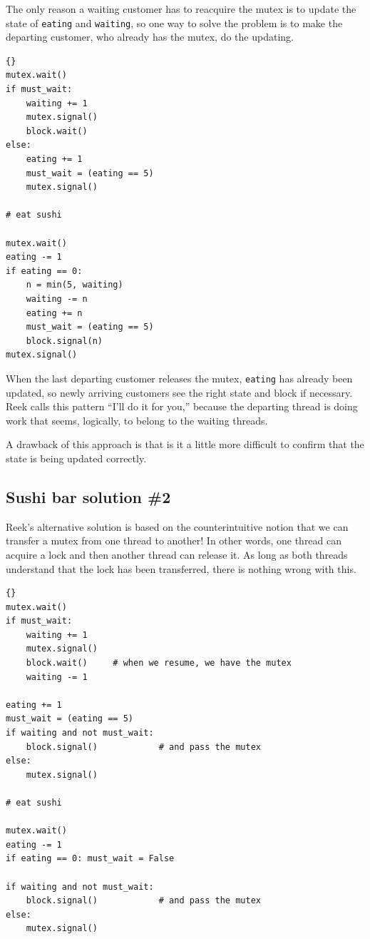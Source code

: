 \documentclass{book}
\newcommand{\clearemptydoublepage}{\newpage\cleardoublepage}
\begin{document}
The only reason a waiting customer has to reacquire the mutex
is to update the state of {\tt eating} and {\tt waiting}, so
one way to solve the problem is to make the departing customer,
who already has the mutex, do the updating.

\begin{lstlisting}[caption={Sushi bar solution \#1}]{}
mutex.wait()
if must_wait:
    waiting += 1
    mutex.signal()
    block.wait()
else:
    eating += 1
    must_wait = (eating == 5)
    mutex.signal()

# eat sushi

mutex.wait()
eating -= 1
if eating == 0:
    n = min(5, waiting)
    waiting -= n
    eating += n
    must_wait = (eating == 5)
    block.signal(n)
mutex.signal()
\end{lstlisting}

When the last departing customer releases the mutex, 
{\tt eating} has already been updated, so newly arriving customers
see the right state and block if necessary.  Reek calls this
pattern ``I'll do it for you,'' because the departing thread
is doing work that seems, logically, to belong to the waiting
threads.

A drawback of this approach is that is it a little more difficult
to confirm that the state is being updated correctly.


\clearemptydoublepage
\subsection {Sushi bar solution \#2}

Reek's alternative solution is based on the counterintuitive
notion that we can transfer a mutex from one thread to another!
In other words, one thread can acquire a lock and then another
thread can release it.  As long as both threads understand
that the lock has been transferred, there is nothing wrong with
this.

\begin{lstlisting}[caption={Sushi bar solution \#2}]{}
mutex.wait()
if must_wait:
    waiting += 1
    mutex.signal()
    block.wait()     # when we resume, we have the mutex
    waiting -= 1

eating += 1
must_wait = (eating == 5)
if waiting and not must_wait:
    block.signal()            # and pass the mutex
else:
    mutex.signal()

# eat sushi

mutex.wait()
eating -= 1
if eating == 0: must_wait = False

if waiting and not must_wait:
    block.signal()            # and pass the mutex
else:
    mutex.signal()
\end{lstlisting}
\end{document}
